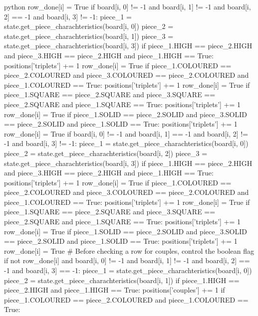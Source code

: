 \begin{mintedbox}{python}
                row_done[i] = True
        if board[i, 0] != -1 and board[i, 1] != -1 and board[i, 2] == -1 and board[i, 3] != -1:
            piece_1 = state.get_piece_charachteristics(board[i, 0])
            piece_2 = state.get_piece_charachteristics(board[i, 1])
            piece_3 = state.get_piece_charachteristics(board[i, 3])
            if piece_1.HIGH == piece_2.HIGH and piece_3.HIGH == piece_2.HIGH and piece_1.HIGH == True:
                positions['triplets'] += 1
                row_done[i] = True
            if piece_1.COLOURED == piece_2.COLOURED and piece_3.COLOURED == piece_2.COLOURED and piece_1.COLOURED == True:
                positions['triplets'] += 1
                row_done[i] = True
            if piece_1.SQUARE == piece_2.SQUARE and piece_3.SQUARE == piece_2.SQUARE and piece_1.SQUARE == True:
                positions['triplets'] += 1
                row_done[i] = True
            if piece_1.SOLID == piece_2.SOLID and piece_3.SOLID == piece_2.SOLID and piece_1.SOLID == True:
                positions['triplets'] += 1
                row_done[i] = True
        if board[i, 0] != -1 and board[i, 1] == -1 and board[i, 2] != -1 and board[i, 3] != -1:
            piece_1 = state.get_piece_charachteristics(board[i, 0])
            piece_2 = state.get_piece_charachteristics(board[i, 2])
            piece_3 = state.get_piece_charachteristics(board[i, 3])
            if piece_1.HIGH == piece_2.HIGH and piece_3.HIGH == piece_2.HIGH and piece_1.HIGH == True:
                positions['triplets'] += 1
                row_done[i] = True
            if piece_1.COLOURED == piece_2.COLOURED and piece_3.COLOURED == piece_2.COLOURED and piece_1.COLOURED == True:
                positions['triplets'] += 1
                row_done[i] = True
            if piece_1.SQUARE == piece_2.SQUARE and piece_3.SQUARE == piece_2.SQUARE and piece_1.SQUARE == True:
                positions['triplets'] += 1
                row_done[i] = True
            if piece_1.SOLID == piece_2.SOLID and piece_3.SOLID == piece_2.SOLID and piece_1.SOLID == True:
                positions['triplets'] += 1
                row_done[i] = True
        # Before checking a row for couples, control the boolean flag
        if not row_done[i] and board[i, 0] != -1 and board[i, 1] != -1 and board[i, 2] == -1 and board[i, 3] == -1:
            piece_1 = state.get_piece_charachteristics(board[i, 0])
            piece_2 = state.get_piece_charachteristics(board[i, 1])
            if piece_1.HIGH == piece_2.HIGH and piece_1.HIGH == True:
                positions['couples'] += 1
            if piece_1.COLOURED == piece_2.COLOURED and piece_1.COLOURED == True:

\end{mintedbox}
